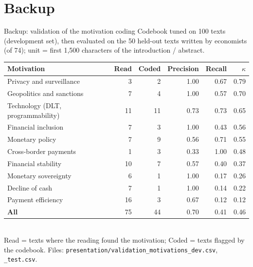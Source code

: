 \documentclass[aspectratio=169,10pt]{beamer}
\begin{document}
\section*{Backup}

\begin{frame}{Backup: validation of the motivation coding}
\footnotesize
Codebook tuned on 100 texts (development set), then evaluated on the 50 \alert{held-out} texts written by economists (of 74); unit = first 1{,}500 characters of the introduction / abstract.\\[3pt]
\begin{tabular}{@{}lrrrrr@{}}\toprule
\textbf{Motivation} & \textbf{Read} & \textbf{Coded} & \textbf{Precision} & \textbf{Recall} & $\kappa$\\\midrule
Privacy and surveillance & 3 & 2 & 1.00 & 0.67 & 0.79 \\
Geopolitics and sanctions & 7 & 4 & 1.00 & 0.57 & 0.70 \\
Technology (DLT, programmability) & 11 & 11 & 0.73 & 0.73 & 0.65 \\
Financial inclusion & 7 & 3 & 1.00 & 0.43 & 0.56 \\
Monetary policy & 7 & 9 & 0.56 & 0.71 & 0.55 \\
Cross-border payments & 1 & 3 & 0.33 & 1.00 & 0.48 \\
Financial stability & 10 & 7 & 0.57 & 0.40 & 0.37 \\
Monetary sovereignty & 6 & 1 & 1.00 & 0.17 & 0.26 \\
Decline of cash & 7 & 1 & 1.00 & 0.14 & 0.22 \\
Payment efficiency & 16 & 3 & 0.67 & 0.12 & 0.12 \\
\midrule
\textbf{All} & 75 & 44 & 0.70 & 0.41 & 0.46 \\
\bottomrule\end{tabular}\\[3pt]
\scriptsize Read = texts where the reading found the motivation; Coded = texts flagged by the codebook. Files: \texttt{presentation/validation\_motivations\_dev.csv}, \texttt{\_test.csv}.
\end{frame}
\end{document}

